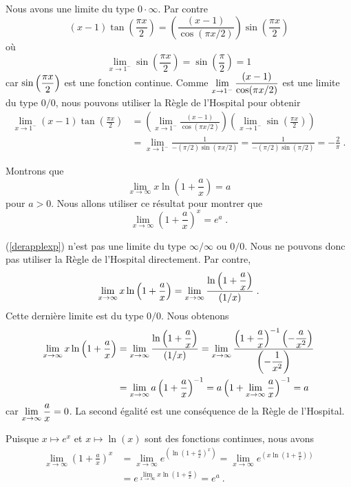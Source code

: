 {\begin{egg}[\eng]
Nous avons une limite du type $0\cdot \infty$.  Par contre
\[
(x-1)\tan\left(\frac{\pi x}{2}\right) =
\left(\frac{(x-1)}{\cos(\pi x/2)}\right)
\sin\left(\frac{\pi x}{2}\right)
\]
où
\[
  \lim_{x\to 1^-} \sin\left(\frac{\pi x}{2}\right) =
  \sin\left(\frac{\pi}{2}\right) = 1
\]
car $\displaystyle \sin\left(\frac{\pi x}{2}\right)$ est une fonction
continue.  Comme
$\displaystyle \lim_{x\to 1^-} \frac{(x-1)}{\cos(\pi x/2)}$
est une limite du type $0/0$, nous pouvons utiliser la Règle de
l'Hospital pour obtenir
\begin{align*}
\lim_{x\rightarrow 1^-} (x-1)\tan\left(\frac{\pi x}{2}\right)
&= \left(\lim_{x\rightarrow 1^-}
\frac{(x-1)}{\cos(\pi x/2)} \right)
\left( \lim_{x\to 1^-} \sin\left(\frac{\pi x}{2}\right) \right)\\
&= \lim_{x\rightarrow 1^-} \frac{1}{-(\pi/2) \sin(\pi x/2)}
= \frac{1}{-(\pi/2) \sin(\pi/2)}
= - \frac{2}{\pi} \; .
\end{align*}
\end{egg}

\begin{egg}[\eng]
Montrons que
\begin{equation} \label{derapplexp}
\lim_{x\rightarrow \infty} x\ln\left(1+\frac{a}{x}\right) = a
\end{equation}
pour $a>0$.  Nous allons utiliser ce résultat pour montrer que
\[
\lim_{x\rightarrow \infty} \left( 1 + \frac{a}{x}\right)^x = e^a \; .
\]

(\ref{derapplexp}) n'est pas une limite du type $\infty/\infty$ ou
$0/0$.  Nous ne pouvons donc pas utiliser la Règle de l'Hospital
directement.  Par contre,
\[
\lim_{x\rightarrow \infty} x\ln\left(1+\frac{a}{x}\right)
= \lim_{x\rightarrow \infty}
\frac{\displaystyle \ln\left(1+\frac{a}{x}\right)}{(1/x)} \; .
\]
Cette dernière limite est du type $0/0$.  Nous obtenons
\begin{align*}
\lim_{x\rightarrow \infty} x\ln\left(1+\frac{a}{x}\right)
&= \lim_{x\rightarrow \infty}
\frac{\displaystyle\ln\left(1+\frac{a}{x}\right)}{(1/x)}
= \lim_{x\rightarrow \infty} \frac{\displaystyle \left(1+\frac{a}{x}\right)^{-1}
\left(-\frac{a}{x^2}\right)}{\displaystyle \left(-\frac{1}{x^2}\right)} \\
&= \lim_{x\rightarrow \infty} a\left(1+\frac{a}{x}\right)^{-1}
= a\left(1+\lim_{x\rightarrow \infty} \frac{a}{x}\right)^{-1} = a
\end{align*}
car $\displaystyle \lim_{x\to \infty} \frac{a}{x} = 0$.  La second
égalité est une conséquence de la Règle de l'Hospital.

Puisque $x \mapsto e^x$ et $x\mapsto \ln(x)$ sont des fonctions
continues, nous avons
\begin{align*}
\lim_{x\rightarrow \infty} \left(1+\frac{a}{x}\right)^x &
= \lim_{x\rightarrow \infty} e^{\left( \ln\left(1+\frac{a}{x}\right)^x\right)}
= \lim_{x\rightarrow \infty} e^{\left(x\ln\left(1+\frac{a}{x}\right)\right)} \\
&= e^{\lim_{x\rightarrow \infty} x\ln\left(1+\frac{a}{x}\right)}
= e^a \ .
\end{align*}


\end{egg}}
